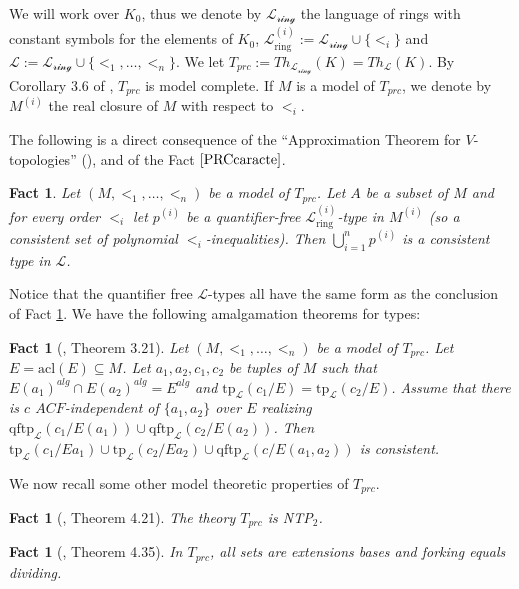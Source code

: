 \documentclass[12pt]{article}
\newtheorem{fact}[thm]{Fact}
\theoremstyle{definition}
\theoremstyle{mystyle}
\theoremstyle{remark}
\newcommand{\LC}{\mathcal{L}}
\newcommand{\LCR}{\mathcal{L_{\text{ring}}}}
\newcommand{\Li}{\mathcal{L}^{(i)}_{\text{ring}}}
\newcommand{\clos}[2]{#1^{(#2)}}
\newcommand{\acl}{\mathrm{acl}}
\newcommand{\tp}{\mathrm{tp}}
\newcommand{\qftp}{\mathrm{qftp}}
\begin{document}
We will work over $K_0$, thus we denote by $\LCR$ the language of
rings with constant symbols for the elements of $K_0$, $\Li:= \LCR
\cup \{<_i\}$ and $\LC:= \LCR \cup \{<_1, \ldots, <_n\}$. We let
$T_{prc}:=Th_{\LCR}(K)=Th_{\mathcal L}(K)$. By Corollary 3.6 of \cite{Mon}, $T_{prc}$ is model
complete. If $M$ is a model of $T_{prc}$, we denote by
$\clos{M}{i}$ the real closure of $M$ with respect to $<_i$.

\bigskip

The following is a direct consequence  of the  ``Approximation Theorem for $V$-topologies'' (\cite[Theorem 4.1]{PreZie}), and of the Fact $\ref{PRCcaracte}$.

\begin{fact}\label{SpTh}
 Let $(M, <_1, \ldots, <_n)$ be a model of  $T_{prc}$. Let $A$ be
 a subset of $M$ and for every order $<_i$ let $p^{(i)}$ be a quantifier-free
 $\Li$-type in $\clos{M}{i}$ (so a consistent set of polynomial $<_i$-inequalities).
Then $\bigcup_{i=1}^n p^{(i)}$ is a consistent type in $\LC$.
\end{fact}


Notice that the quantifier free $\LC$-types all have the same form
as the conclusion of Fact \ref{SpTh}.
We have the following amalgamation theorems for types:

\begin{fact}[\cite{Mon}, Theorem 3.21]\label{thamalgamation}
 Let $(M, <_1, \ldots, <_n)$ be a model of  $T_{prc}$. Let $E = \acl(E) \subseteq M$. Let $a_1, a_2, c_1,c_2$ be tuples of $M$ such that $E(a_1)^{alg}\cap E(a_2)^{alg}=E^{alg}$ and $\tp_{\LC}(c_1/E)=\tp_{\LC}(c_2/E)$. Assume that there is $c$ $ACF$-independent of $\{a_1,a_2\}$ over $E$ realizing $\qftp_{\LC}(c_1/E(a_1)) \cup \qftp_{\LC}(c_2/E(a_2))$.
Then $\tp_{\LC}(c_1/Ea_1) \cup \tp_{\LC}(c_2/Ea_2) \cup
\qftp_{\LC}(c/E(a_1,a_2))$ is consistent.
\end{fact}

\medskip

We now recall some other model theoretic properties of $T_{prc}$.

\begin{fact}[\cite{Mon}, Theorem 4.21]
The theory $T_{prc}$ is NTP$_2$.
\end{fact}

\begin{fact}[\cite{Mon}, Theorem 4.35]
In $T_{prc}$, all sets are extensions bases and forking equals dividing.
\end{fact}
\end{document}
